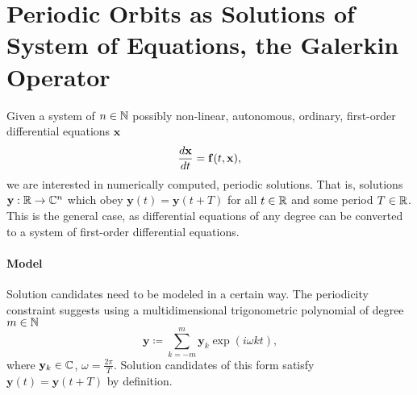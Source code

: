 \section{Periodic Orbits as Solutions of System of Equations, the Galerkin Operator}

Given a system of $n \in \mathbb{N}$ possibly non-linear, autonomous, ordinary, first-order differential equations $\mathbf{x}$
	\begin{equation} \label{eq:SDE}
		\frac{d\mathbf{x}}{dt} = \mathbf{f}(t, \mathbf{x}) \text,
	\end{equation}
we are interested in numerically computed, periodic solutions.
That is, solutions $\mathbf{y}: \mathbb{R} \to \mathbb{C}^n$ which obey $\mathbf{y}(t) = \mathbf{y}(t+T)$ for all $t \in \mathbb{R}$ and some period $T \in \mathbb{R}$.
This is the general case, as differential equations of any degree can be converted to a system of first-order differential equations.

\paragraph{Model} Solution candidates need to be modeled in a certain way.
The periodicity constraint suggests using a multidimensional trigonometric polynomial of degree $m \in \mathbb{N}$
	\[
		\mathbf{y} \coloneqq \sum_{k = -m}^m \mathbf{y}_k \exp\left(i \omega k t\right) \text{,}
	\]
where $\mathbf{y}_k \in \mathbb{C}$, $\omega = \frac{2\pi}T$. %
Solution candidates of this form satisfy $\mathbf{y}(t) = \mathbf{y}(t+T)$ by definition.

